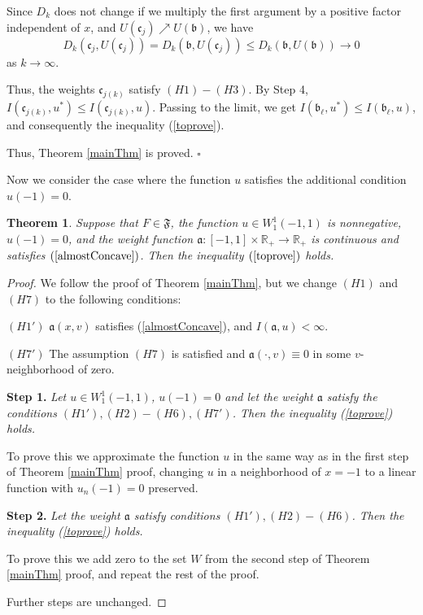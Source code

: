 \documentclass[12pt]{article}
\newcommand{\Real}{\mathbb R}
\renewcommand{\le}{\leqslant}
\newtheorem{thm}{Theorem}
\newcommand{\W}{W_1^1}
\begin{document}
Since $D_k$ does not change if we multiply the first argument by a positive factor independent of $x$,
and $U(\mathfrak c_j) \nearrow U(\mathfrak b)$, we have
$$D_k(\mathfrak c_j, U(\mathfrak c_j)) = D_k(\mathfrak b, U(\mathfrak c_j)) \le D_k(\mathfrak b, U(\mathfrak b)) \to 0$$
as $k \to \infty$.

Thus, the weights $\mathfrak c_{j(k)}$ satisfy $(H1)-(H3)$.
By Step 4, $I(\mathfrak c_{j(k)}, u^*) \le I(\mathfrak c_{j(k)}, u)$.
Passing to the limit, we get $I(\mathfrak b_{\ell}, u^*) \le I(\mathfrak b_{\ell}, u)$,
and consequently the inequality (\ref{toprove}).

Thus, Theorem \ref{mainThm} is proved.
\hfill $\square$

\medskip

Now we consider the case where the function $u$ satisfies the additional condition $u(-1) = 0$.
\begin{thm}
Suppose that $F \in \mathfrak{F}$, the function $u \in \W(-1, 1)$ is nonnegative, $u(-1) = 0$,
and the weight function $\mathfrak a: [-1, 1] \times \Real_+ \to \Real_+$ is continuous
and satisfies $(\ref{almostConcave})$.
Then the inequality $(\ref{toprove})$ holds.
\end{thm}

\begin{proof}
We follow the proof of Theorem \ref{mainThm},
but we change $(H1)$ and $(H7)$ to the following conditions:

\bigskip
\noindent
$(H1')$ $\mathfrak a(x, v)$ satisfies (\ref{almostConcave}), and $I(\mathfrak a, u) < \infty$.

\bigskip
\noindent
$(H7')$ The assumption $(H7)$ is satisfied and $\mathfrak a(\cdot, v) \equiv 0$ in some $v$-neighborhood of zero.

\bigskip
{\bf Step 1.} {\it Let $u \in \W(-1, 1)$, $u(-1) = 0$ and let the weight $\mathfrak a$ satisfy the conditions $(H1'), (H2)-(H6), (H7')$.
Then the inequality (\ref{toprove}) holds.}

To prove this we approximate the function $u$ in the same way as in the first step of Theorem \ref{mainThm} proof,
changing $u$ in a neighborhood of $x = -1$ to a linear function with $u_n(-1) = 0$ preserved.

\bigskip
{\bf Step 2.} {\it Let the weight $\mathfrak a$ satisfy conditions $(H1'), (H2)-(H6)$.
Then the inequality (\ref{toprove}) holds.}

To prove this we add zero to the set $W$ from the second step of Theorem \ref{mainThm} proof,
and repeat the rest of the proof.

\medskip

Further steps are unchanged.
\end{proof}
\end{document}
